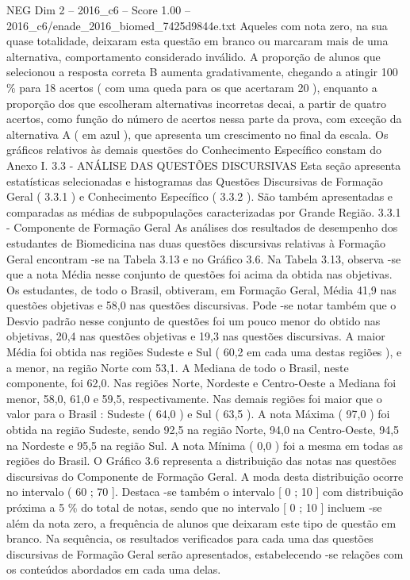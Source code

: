 \begin{textsample}{NEG Dim 2 – 2016\_c6 – Score 1.00 – 2016\_c6/enade\_2016\_biomed\_7425d9844e.txt}
Aqueles com nota zero, na sua quase totalidade, deixaram esta questão em branco ou marcaram mais de uma alternativa, comportamento considerado inválido.
A proporção de alunos que selecionou a resposta correta B aumenta gradativamente, chegando a atingir 100 \% para 18 acertos ( com uma queda para os que acertaram 20 ), enquanto a proporção dos que escolheram alternativas incorretas decai, a partir de quatro acertos, como função do número de acertos nessa parte da prova, com exceção da alternativa A ( em azul ), que apresenta um crescimento no final da escala.
Os gráficos relativos às demais questões do Conhecimento Específico constam do Anexo I. 3.3 - ANÁLISE DAS QUESTÕES DISCURSIVAS Esta seção apresenta estatísticas selecionadas e histogramas das Questões Discursivas de Formação Geral ( 3.3.1 ) e Conhecimento Específico ( 3.3.2 ).
São também apresentadas e comparadas as médias de subpopulações caracterizadas por Grande Região. 3.3.1 - Componente de Formação Geral As análises dos resultados de desempenho dos estudantes de Biomedicina nas duas questões discursivas relativas à Formação Geral encontram -se na Tabela 3.13 e no Gráfico 3.6.
Na Tabela 3.13, observa -se que a nota Média nesse conjunto de questões foi acima da obtida nas objetivas.
Os estudantes, de todo o Brasil, obtiveram, em Formação Geral, Média 41,9 nas questões objetivas e 58,0 nas questões discursivas.
Pode -se notar também que o Desvio padrão nesse conjunto de questões foi um pouco menor do obtido nas objetivas, 20,4 nas questões objetivas e 19,3 nas questões discursivas.
A maior Média foi obtida nas regiões Sudeste e Sul ( 60,2 em cada uma destas regiões ), e a menor, na região Norte com 53,1.
A Mediana de todo o Brasil, neste componente, foi 62,0.
Nas regiões Norte, Nordeste e Centro-Oeste a Mediana foi menor, 58,0, 61,0 e 59,5, respectivamente.
Nas demais regiões foi maior que o valor para o Brasil : Sudeste ( 64,0 ) e Sul ( 63,5 ).
A nota Máxima ( 97,0 ) foi obtida na região Sudeste, sendo 92,5 na região Norte, 94,0 na Centro-Oeste, 94,5 na Nordeste e 95,5 na região Sul.
A nota Mínima ( 0,0 ) foi a mesma em todas as regiões do Brasil.
O Gráfico 3.6 representa a distribuição das notas nas questões discursivas do Componente de Formação Geral.
A moda desta distribuição ocorre no intervalo ( 60 ; 70 ].
Destaca -se também o intervalo [ 0 ; 10 ] com distribuição próxima a 5 \% do total de notas, sendo que no intervalo [ 0 ; 10 ] incluem -se além da nota zero, a frequência de alunos que deixaram este tipo de questão em branco.
Na sequência, os resultados verificados para cada uma das questões discursivas de Formação Geral serão apresentados, estabelecendo -se relações com os conteúdos abordados em cada uma delas.

\end{textsample}
